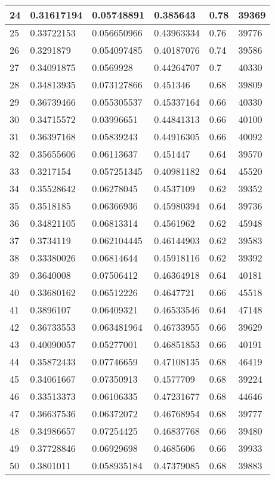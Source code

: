 \begin{longtable}{|l|l|l|l|l|l|}
24 & 0.31617194 & 0.05748891 & 0.385643 & 0.78 & 39369 \\ \hline 
25 & 0.33722153 & 0.056650966 & 0.43963334 & 0.76 & 39776 \\ \hline 
26 & 0.3291879 & 0.054097485 & 0.40187076 & 0.74 & 39586 \\ \hline 
27 & 0.34091875 & 0.0569928 & 0.44264707 & 0.7 & 40330 \\ \hline 
28 & 0.34813935 & 0.073127866 & 0.451346 & 0.68 & 39809 \\ \hline 
29 & 0.36739466 & 0.055305537 & 0.45337164 & 0.66 & 40330 \\ \hline 
30 & 0.34715572 & 0.03996651 & 0.44841313 & 0.66 & 40100 \\ \hline 
31 & 0.36397168 & 0.05839243 & 0.44916305 & 0.66 & 40092 \\ \hline 
32 & 0.35655606 & 0.06113637 & 0.451447 & 0.64 & 39570 \\ \hline 
33 & 0.3217154 & 0.057251345 & 0.40981182 & 0.64 & 45520 \\ \hline 
34 & 0.35528642 & 0.06278045 & 0.4537109 & 0.62 & 39352 \\ \hline 
35 & 0.3518185 & 0.06366936 & 0.45980394 & 0.64 & 39736 \\ \hline 
36 & 0.34821105 & 0.06813314 & 0.4561962 & 0.62 & 45948 \\ \hline 
37 & 0.3734119 & 0.062104445 & 0.46144903 & 0.62 & 39583 \\ \hline 
38 & 0.33380026 & 0.06814644 & 0.45918116 & 0.62 & 39392 \\ \hline 
39 & 0.3640008 & 0.07506412 & 0.46364918 & 0.64 & 40181 \\ \hline 
40 & 0.33680162 & 0.06512226 & 0.4647721 & 0.66 & 45518 \\ \hline 
41 & 0.3896107 & 0.06409321 & 0.46533546 & 0.64 & 47148 \\ \hline 
42 & 0.36733553 & 0.063481964 & 0.46733955 & 0.66 & 39629 \\ \hline 
43 & 0.40090057 & 0.05277001 & 0.46851853 & 0.66 & 40191 \\ \hline 
44 & 0.35872433 & 0.07746659 & 0.47108135 & 0.68 & 46419 \\ \hline 
45 & 0.34061667 & 0.07350913 & 0.4577709 & 0.68 & 39224 \\ \hline 
46 & 0.33513373 & 0.06106335 & 0.47231677 & 0.68 & 44646 \\ \hline 
47 & 0.36637536 & 0.06372072 & 0.46768954 & 0.68 & 39777 \\ \hline 
48 & 0.34986657 & 0.07254425 & 0.46837768 & 0.66 & 39480 \\ \hline 
49 & 0.37728846 & 0.06929698 & 0.4685606 & 0.66 & 39933 \\ \hline 
50 & 0.3801011 & 0.058935184 & 0.47379085 & 0.68 & 39883 \\ \hline 
\end{longtable}